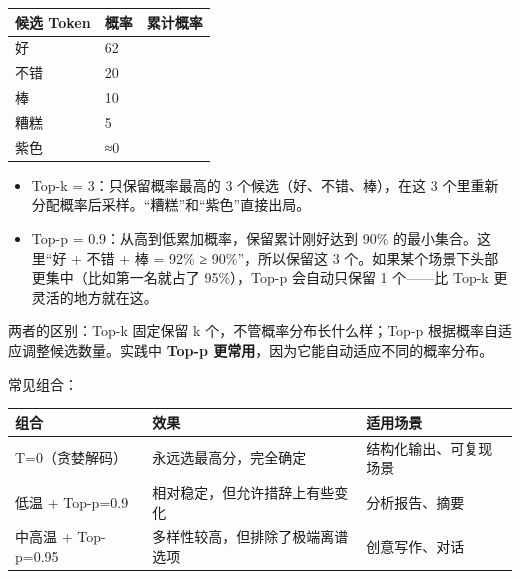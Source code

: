 \documentclass[10pt,a4paper]{ctexart}
\begin{document}
{\footnotesize
\begin{tabularx}{\textwidth}{|X|X|X|}
\hline
\textbf{候选 Token} & \textbf{概率} & \textbf{累计概率} \\
\hline
好 & 62\\%
\hline
不错 & 20\\%
\hline
棒 & 10\\%
\hline
糟糕 & 5\\%
\hline
紫色 & ≈0\\%
\hline
\end{tabularx}
}


\begin{itemize}[itemsep=2pt, topsep=4pt]
  \item Top-k = 3：只保留概率最高的 3 个候选（好、不错、棒），在这 3 个里重新分配概率后采样。“糟糕”和“紫色”直接出局。
  \item Top-p = 0.9：从高到低累加概率，保留累计刚好达到 90\% 的最小集合。这里“好 + 不错 + 棒 = 92\% ≥ 90\%”，所以保留这 3 个。如果某个场景下头部更集中（比如第一名就占了 95\%），Top-p 会自动只保留 1 个——比 Top-k 更灵活的地方就在这。
\end{itemize}


两者的区别：Top-k 固定保留 k 个，不管概率分布长什么样；Top-p 根据概率自适应调整候选数量。实践中 \textbf{Top-p 更常用}，因为它能自动适应不同的概率分布。



常见组合：


{\footnotesize
\begin{tabularx}{\textwidth}{|X|X|X|}
\hline
\textbf{组合} & \textbf{效果} & \textbf{适用场景} \\
\hline
T=0（贪婪解码） & 永远选最高分，完全确定 & 结构化输出、可复现场景 \\
\hline
低温 + Top-p=0.9 & 相对稳定，但允许措辞上有些变化 & 分析报告、摘要 \\
\hline
中高温 + Top-p=0.95 & 多样性较高，但排除了极端离谱选项 & 创意写作、对话 \\
\hline
\end{tabularx}
}
\end{document}
